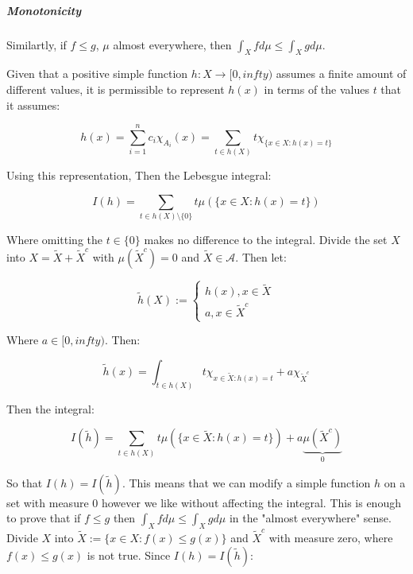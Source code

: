 \subparagraph{Monotonicity}

Similartly, if $f\leq g$,  $\mu$ almost everywhere, then $\int_X f d\mu \leq \int_X g d\mu$.


Given that a positive simple function $h:X \rightarrow [0,infty)$ assumes a finite amount of different values, it is permissible to represent $h(x)$ in terms of the values $t$ that it assumes:

\begin{equation}
h(x) = \sum_{i=1}^n c_i \chi_{A_i} (x) = \sum_{t\in h(X)} t \chi_{\{x\in X: h(x) = t\}}
\end{equation} 

Using this representation, Then the Lebesgue integral:

\begin{equation}
I(h) = \sum_{t\in h(X)\setminus \{0\}} t \mu (\{ x\in X : h(x) = t \} ) 
\end{equation}

Where omitting the $t\in\{0\}$ makes no difference to the integral. Divide the set $X$ into $X = \tilde{X} + \tilde{X}^c$ with $\mu(\tilde{X}^c) = 0 $ and $\tilde{X} \in \mathscr{A}$. Then let:

\begin{equation}
\tilde{h}(X) := \left\{ \begin{array}{l} h(x), x\in \tilde{X}\\ a, x\in \tilde{X}^c \end{array} \right.
\end{equation}

Where $a \in [0, infty)$.  Then:

\begin{equation}
\tilde{h}(x) = \int_{t\in h(X)} t \chi_{x\in \tilde{X}: h(x) = t} + a \chi_{\tilde{X}^c}
\end{equation}

Then the integral:

\begin{equation}
I (\tilde{h}) = \sum_{t\in h(X)} t \mu( \{ x\in \tilde{X} : h(x) = t \}) + a \underbrace{\mu(\tilde{X}^c)}_{0}
\end{equation}

So that $I(h) = I(\tilde{h})$. This means that we can modify a simple function $h$ on a set with measure $0$ however we like without affecting the integral. This is enough to prove that if $f\leq g$ then $\int_X f d\mu \leq \int_X g d\mu$ in the "almost everywhere" sense. Divide $X$ into $\tilde{X}:= \{x \in X: f(x) \leq g(x) \}$ and $\tilde{X}^c$ with measure zero, where $f(x) \leq g(x)$ is not true. Since $I(h) = I(\tilde{h})$:

